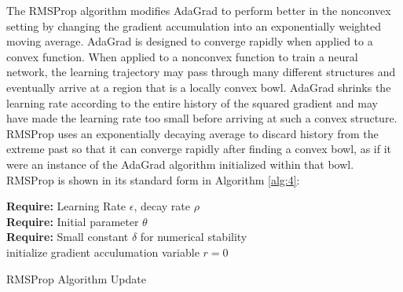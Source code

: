         The RMSProp algorithm \cite{DBLP:journals/corr/abs-1207-0580} modifies AdaGrad to perform better in
    the nonconvex setting by changing the gradient accumulation into an exponentially
    weighted moving average. AdaGrad is designed to converge rapidly when applied to
    a convex function. When applied to a nonconvex function to train a neural network,
    the learning trajectory may pass through many different structures and eventually
    arrive at a region that is a locally convex bowl. AdaGrad shrinks the learning rate
    according to the entire history of the squared gradient and may have made the
    learning rate too small before arriving at such a convex structure. 
        RMSProp uses an exponentially decaying average to discard history from the extreme past so that
    it can converge rapidly after finding a convex bowl, as if it were an instance of the
    AdaGrad algorithm initialized within that bowl. RMSProp is shown in its standard form in Algorithm \ref{alg:4}:
 \vspace{5mm}
    \par
            \begin{algorithm}[H]\label{alg:4}
            \textbf{Require:} Learning Rate $\epsilon$, decay rate $\rho$ \\
            \textbf{Require:} Initial parameter $\theta$ \\
            \textbf{Require:} Small constant $\delta $ for numerical stability \\
                initialize gradient acculumation variable $r=0$ \\
            
            \caption{RMSProp Algorithm Update}
            \end{algorithm}

